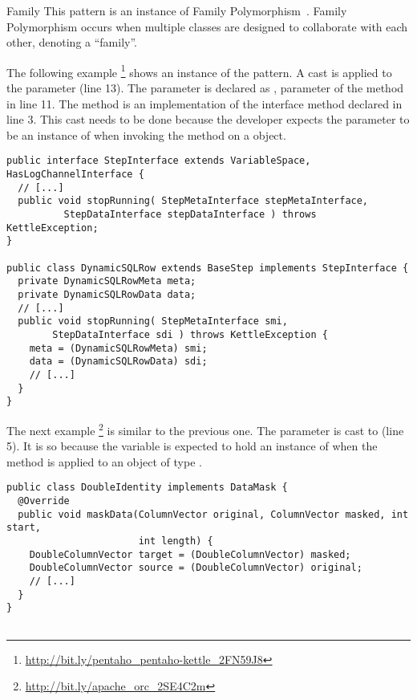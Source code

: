 \begin{pattern}{Family}
This pattern is an instance of Family Polymorphism~\citep{ernstFamilyPolymorphism2001}.
Family Polymorphism occurs when multiple classes are designed to collaborate with each other, denoting a ``family''.

\instances{}
The following example%
\footnote{\url{http://bit.ly/pentaho_pentaho-kettle_2FN59J8}}
shows an instance of the \thisp{} pattern.
%
%
A cast is applied to the parameter  (line 13).
The  parameter is declared as , parameter of the  method in line 11.
The  method is an implementation of the interface method declared in line 3.
%
%
This cast needs to be done because the developer expects the  parameter to be an instance of  when invoking the  method on a  object.

\begin{verbatim}
public interface StepInterface extends VariableSpace, HasLogChannelInterface {
  // [...]
  public void stopRunning( StepMetaInterface stepMetaInterface,
          StepDataInterface stepDataInterface ) throws KettleException;
}

public class DynamicSQLRow extends BaseStep implements StepInterface {
  private DynamicSQLRowMeta meta;
  private DynamicSQLRowData data;
  // [...]
  public void stopRunning( StepMetaInterface smi,
        StepDataInterface sdi ) throws KettleException {
    meta = (DynamicSQLRowMeta) smi;
    data = (DynamicSQLRowData) sdi;
    // [...]
  }
}
\end{verbatim}

The next example%
\footnote{\url{http://bit.ly/apache_orc_2SE4C2m}}
is similar to the previous one.
The  parameter is cast to  (line 5).
It is so because the  variable is expected to hold an instance of  when the  method is applied to an object of type .

\begin{verbatim}
public class DoubleIdentity implements DataMask {
  @Override
  public void maskData(ColumnVector original, ColumnVector masked, int start,
                       int length) {
    DoubleColumnVector target = (DoubleColumnVector) masked;
    DoubleColumnVector source = (DoubleColumnVector) original;
    // [...]
  }
}


\end{verbatim}
\end{pattern}
